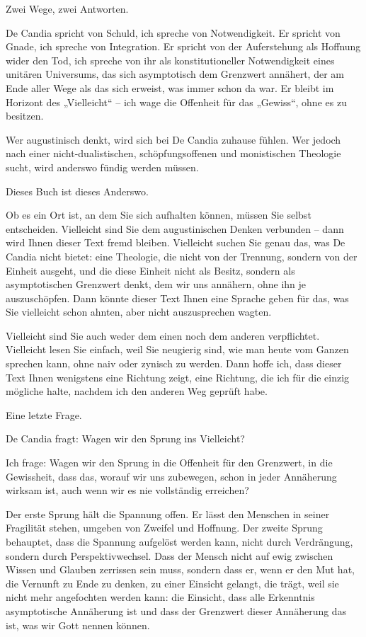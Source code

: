 \documentclass[
  ngerman,
]{article}
\begin{document}
Zwei Wege, zwei Antworten.

De Candia spricht von Schuld, ich spreche von Notwendigkeit. Er
spricht von Gnade, ich spreche von Integration. Er spricht von der
Auferstehung als Hoffnung wider den Tod, ich spreche von ihr als
konstitutioneller Notwendigkeit eines unitären Universums, das sich
asymptotisch dem Grenzwert annähert, der am Ende aller Wege als das sich
erweist, was immer schon da war. Er bleibt im Horizont des „Vielleicht``
-- ich wage die Offenheit für das „Gewiss``, ohne es zu besitzen.

Wer augustinisch denkt, wird sich bei De Candia zuhause fühlen. Wer
jedoch nach einer nicht-dualistischen, schöpfungsoffenen und
monistischen Theologie sucht, wird anderswo fündig werden müssen.

Dieses Buch ist dieses Anderswo.

Ob es ein Ort ist, an dem Sie sich aufhalten können, müssen Sie selbst
entscheiden. Vielleicht sind Sie dem augustinischen Denken verbunden --
dann wird Ihnen dieser Text fremd bleiben. Vielleicht suchen Sie genau
das, was De Candia nicht bietet: eine Theologie, die nicht von der
Trennung, sondern von der Einheit ausgeht, und die diese Einheit nicht
als Besitz, sondern als asymptotischen Grenzwert denkt, dem wir uns
annähern, ohne ihn je auszuschöpfen. Dann könnte dieser Text Ihnen eine
Sprache geben für das, was Sie vielleicht schon ahnten, aber nicht
auszusprechen wagten.

Vielleicht sind Sie auch weder dem einen noch dem anderen verpflichtet.
Vielleicht lesen Sie einfach, weil Sie neugierig sind, wie man heute vom
Ganzen sprechen kann, ohne naiv oder zynisch zu werden. Dann hoffe ich,
dass dieser Text Ihnen wenigstens eine Richtung zeigt, eine Richtung,
die ich für die einzig mögliche halte, nachdem ich den anderen Weg
geprüft habe.

Eine letzte Frage.

De Candia fragt: Wagen wir den Sprung ins Vielleicht?

Ich frage: Wagen wir den Sprung in die Offenheit für den Grenzwert, in
die Gewissheit, dass das, worauf wir uns zubewegen, schon in jeder
Annäherung wirksam ist, auch wenn wir es nie vollständig erreichen?

Der erste Sprung hält die Spannung offen. Er lässt den Menschen in
seiner Fragilität stehen, umgeben von Zweifel und Hoffnung. Der zweite
Sprung behauptet, dass die Spannung aufgelöst werden kann, nicht durch
Verdrängung, sondern durch Perspektivwechsel. Dass der Mensch nicht auf
ewig zwischen Wissen und Glauben zerrissen sein muss, sondern dass er,
wenn er den Mut hat, die Vernunft zu Ende zu denken, zu einer Einsicht
gelangt, die trägt, weil sie nicht mehr angefochten werden kann: die
Einsicht, dass alle Erkenntnis asymptotische Annäherung ist und dass der
Grenzwert dieser Annäherung das ist, was wir Gott nennen können.
\end{document}
